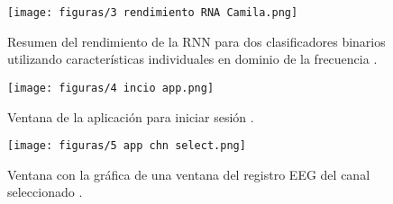 \begin{figure}[t]
    \centering
    \texttt{[image: figuras/3 rendimiento RNA Camila.png]}
    \caption{Resumen del rendimiento de la RNN para dos clasificadores binarios utilizando características individuales en dominio de la frecuencia \cite{camila_2022}.}
    \label{fig:camila_tabla_res1}
\end{figure}

\begin{figure}[t]
    \centering
    \texttt{[image: figuras/4 incio app.png]}
    \caption{Ventana de la aplicación para iniciar sesión \cite{david_2022}.}
    \label{fig:app_ini}
\end{figure}

\begin{figure}[ht]
    \centering
    \texttt{[image: figuras/5 app chn select.png]}
    \caption{Ventana con la gráfica de una ventana del registro EEG del canal seleccionado \cite{david_2022}.}
    \label{fig:app_chn_slct}
\end{figure}
